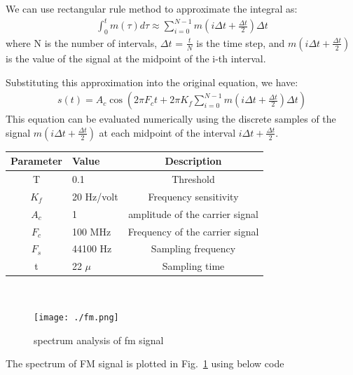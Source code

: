 \documentclass[journal,5pt,twocolumn]{IEEEtran}
\newcommand\figref{Fig.~\ref}
\begin{document}
\begin{enumerate}
 \fi
 
We can use rectangular rule method to approximate the integral as:
\begin{align}
\int_{0}^t m(\tau) d\tau \approx \sum_{i=0}^{N-1} m\left(i \Delta t + \frac{\Delta t}{2}\right) \Delta t
\end{align}
where N is the number of intervals, $\Delta t$ = $\frac{t}{N}$ is the time step, and $m\left(i \Delta t + \frac{\Delta t}{2}\right)$ is the value of the signal at the midpoint of the i-th interval.

Substituting this approximation into the original equation, we have:
\begin{align}
s(t) = A_c \cos \left(2 \pi F_c t +2\pi K_{f} \sum_{i=0}^{N-1} m\left(i \Delta t + \frac{\Delta t}{2}\right) \Delta t\right)
\end{align}
This equation can be evaluated numerically using the discrete samples of the signal $m\left(i \Delta t + \frac{\Delta t}{2}\right)$ at each midpoint of the interval $i\Delta t + \frac{\Delta t}{2}. $
 
 
 
 
    \begin{tabular}{|c|l|c|}
    \hline 
    \textbf{Parameter} & \textbf{Value} &\textbf{Description} \\ \hline
    T&0.1&Threshold\\
    $K_{f}$ & 20 Hz/volt & Frequency sensitivity \\ 
    $A_c$ & 1  & amplitude of the carrier signal\\ 
    $F_c $& 100 MHz & Frequency of the carrier signal\\ 
    $F_s$ & 44100 Hz & Sampling frequency\\ 
    t     & 22 $\mu$ & Sampling time\\  \hline
    \end{tabular}
    \\



       

 \begin{figure}
\centering 
\texttt{[image: ./fm.png]}
\caption{spectrum analysis of fm signal}
\label{fig:fm_spectrum}
\end{figure}

The spectrum of FM signal is plotted in \figref{fig:fm_spectrum} using below code
\begin{center}
\end{center}



\end{enumerate}
\end{document}
